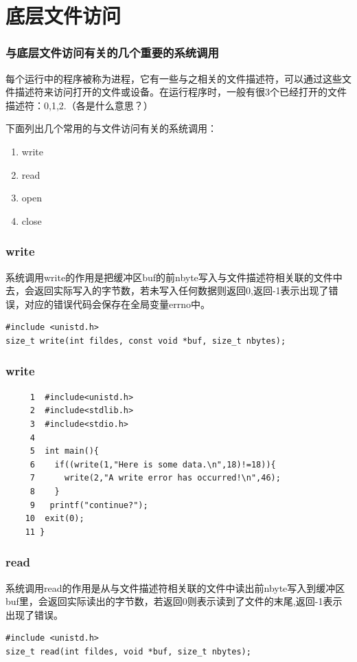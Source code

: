\documentclass{beamer}
\begin{document}
\section{底层文件访问}
\begin{frame}
\frametitle{与底层文件访问有关的几个重要的系统调用}
每个运行中的程序被称为进程，它有一些与之相关的文件描述符，可以通过这些文件描述符来访问打开的文件或设备。在运行程序时，一般有很3个已经打开的文件描述符：0,1,2.（各是什么意思？）

下面列出几个常用的与文件访问有关的系统调用：
\begin{enumerate}
\item
write
\item
read
\item
open
\item
close


\end{enumerate}


\end{frame}
\begin{frame}[fragile]
\frametitle{write}
系统调用write的作用是把缓冲区buf的前nbyte写入与文件描述符相关联的文件中去，会返回实际写入的字节数，若未写入任何数据则返回0,返回-1表示出现了错误，对应的错误代码会保存在全局变量errno中。
\begin{example}[write系统调用的原型]
\begin{verbatim}
#include <unistd.h>
size_t write(int fildes, const void *buf, size_t nbytes);
\end{verbatim}
\end{example}

\end{frame}



\begin{frame}[fragile]
\frametitle{write}
\begin{example}[write系统调用的使用实例]
\begin{verbatim}
     1  #include<unistd.h>
     2  #include<stdlib.h>
     3  #include<stdio.h>
     4
     5  int main(){
     6    if((write(1,"Here is some data.\n",18)!=18)){
     7      write(2,"A write error has occurred!\n",46);
     8    }
     9   printf("continue?");
    10  exit(0);
    11 }
\end{verbatim}
\end{example}

\end{frame}

\begin{frame}[fragile]
\frametitle{read}
系统调用read的作用是从与文件描述符相关联的文件中读出前nbyte写入到缓冲区buf里，会返回实际读出的字节数，若返回0则表示读到了文件的末尾,返回-1表示出现了错误。
\begin{example}[read系统调用的原型]
\begin{verbatim}
#include <unistd.h>
size_t read(int fildes, void *buf, size_t nbytes);
\end{verbatim}
\end{example}

\end{frame}
\end{document}
